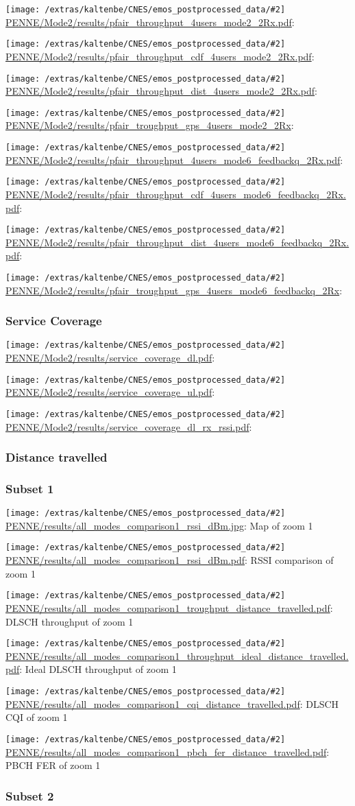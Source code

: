 \documentclass[a4paper,10pt]{article}
\newcommand{\printfile}[2][]{
 \begin{minipage}{8cm}
  \centering
  \texttt{[image: /extras/kaltenbe/CNES/emos\_postprocessed\_data/\#2]}
  \url{#2}: #1

 \end{minipage}
}
\begin{document}
\printfile{PENNE/Mode2/results/pfair_throughput_4users_mode2_2Rx.pdf}
\printfile{PENNE/Mode2/results/pfair_throughput_cdf_4users_mode2_2Rx.pdf}

\printfile{PENNE/Mode2/results/pfair_throughput_dist_4users_mode2_2Rx.pdf}
\printfile{PENNE/Mode2/results/pfair_troughput_gps_4users_mode2_2Rx}

\printfile{PENNE/Mode2/results/pfair_throughput_4users_mode6_feedbackq_2Rx.pdf}
\printfile{PENNE/Mode2/results/pfair_throughput_cdf_4users_mode6_feedbackq_2Rx.pdf}

\printfile{PENNE/Mode2/results/pfair_throughput_dist_4users_mode6_feedbackq_2Rx.pdf}
\printfile{PENNE/Mode2/results/pfair_troughput_gps_4users_mode6_feedbackq_2Rx}


\subsubsection{Service Coverage}

\printfile{PENNE/Mode2/results/service_coverage_dl.pdf}
\printfile{PENNE/Mode2/results/service_coverage_ul.pdf}

\printfile{PENNE/Mode2/results/service_coverage_dl_rx_rssi.pdf}

\subsubsection{Distance travelled}
\label{sec:dist_travelled_penne}

\subsubsection*{Subset 1}

\printfile[Map of zoom 1]{PENNE/results/all_modes_comparison1_rssi_dBm.jpg}
\printfile[RSSI comparison of zoom 1]{PENNE/results/all_modes_comparison1_rssi_dBm.pdf}

\printfile[DLSCH throughput of zoom 1]{PENNE/results/all_modes_comparison1_troughput_distance_travelled.pdf}
\printfile[Ideal DLSCH throughput of zoom 1]{PENNE/results/all_modes_comparison1_throughput_ideal_distance_travelled.pdf}

\printfile[DLSCH CQI of zoom 1]{PENNE/results/all_modes_comparison1_cqi_distance_travelled.pdf}
\printfile[PBCH FER of zoom 1]{PENNE/results/all_modes_comparison1_pbch_fer_distance_travelled.pdf}

\subsubsection*{Subset 2}
\end{document}
